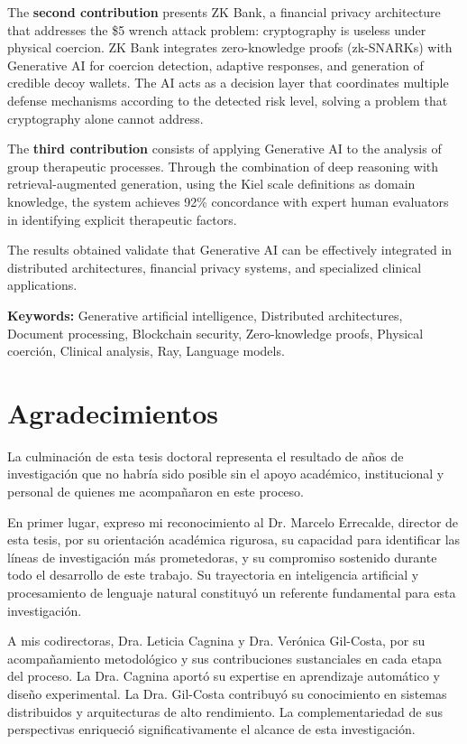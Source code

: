 \documentclass[12pt,a4paper,twoside]{book}
\begin{document}
The \textbf{second contribution} presents ZK Bank, a financial privacy architecture that addresses the \$5 wrench attack problem: cryptography is useless under physical coercion. ZK Bank integrates zero-knowledge proofs (zk-SNARKs) with Generative AI for coercion detection, adaptive responses, and generation of credible decoy wallets. The AI acts as a decision layer that coordinates multiple defense mechanisms according to the detected risk level, solving a problem that cryptography alone cannot address.

The \textbf{third contribution} consists of applying Generative AI to the analysis of group therapeutic processes. Through the combination of deep reasoning with retrieval-augmented generation, using the Kiel scale definitions as domain knowledge, the system achieves 92\% concordance with expert human evaluators in identifying explicit therapeutic factors.

The results obtained validate that Generative AI can be effectively integrated in distributed architectures, financial privacy systems, and specialized clinical applications.

\textbf{Keywords:} Generative artificial intelligence, Distributed architectures, Document processing, Blockchain security, Zero-knowledge proofs, Physical coerción, Clinical analysis, Ray, Language models.

\chapter*{Agradecimientos}

La culminación de esta tesis doctoral representa el resultado de años de investigación que no habría sido posible sin el apoyo académico, institucional y personal de quienes me acompañaron en este proceso.

En primer lugar, expreso mi reconocimiento al Dr. Marcelo Errecalde, director de esta tesis, por su orientación académica rigurosa, su capacidad para identificar las líneas de investigación más prometedoras, y su compromiso sostenido durante todo el desarrollo de este trabajo. Su trayectoria en inteligencia artificial y procesamiento de lenguaje natural constituyó un referente fundamental para esta investigación.

A mis codirectoras, Dra. Leticia Cagnina y Dra. Verónica Gil-Costa, por su acompañamiento metodológico y sus contribuciones sustanciales en cada etapa del proceso. La Dra. Cagnina aportó su expertise en aprendizaje automático y diseño experimental. La Dra. Gil-Costa contribuyó su conocimiento en sistemas distribuidos y arquitecturas de alto rendimiento. La complementariedad de sus perspectivas enriqueció significativamente el alcance de esta investigación.
\end{document}
